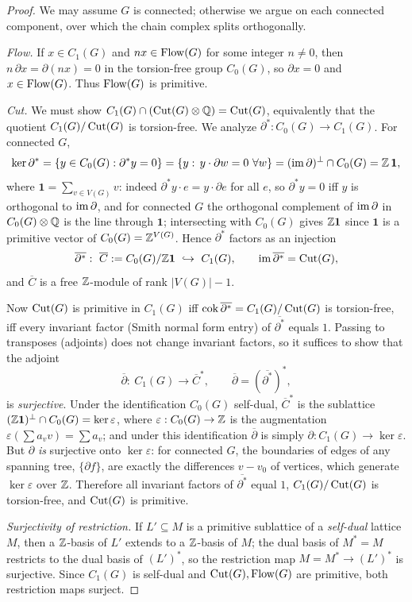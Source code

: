 \begin{proof}
We may assume $G$ is connected; otherwise we argue on each connected component, over which
the chain complex splits orthogonally.

\emph{Flow.}  If $x\in C_1(G)$ and $nx\in\operatorname{Flow}(G)$ for some integer $n\ne 0$, then
$n\,\partial x=\partial(nx)=0$ in the torsion-free group $C_0(G)$, so $\partial x=0$ and
$x\in\operatorname{Flow}(G)$.  Thus $\operatorname{Flow}(G)$ is primitive.

\emph{Cut.}  We must show $C_1(G)\cap(\operatorname{Cut}(G)\otimes\mathbb{Q})=\operatorname{Cut}(G)$, equivalently that the
quotient $C_1(G)/\operatorname{Cut}(G)$ is torsion-free.  We analyze $\partial^\ast:C_0(G)\to C_1(G)$.
For connected $G$,
\[
\ker\partial^\ast=\{y\in C_0(G):\partial^\ast y=0\}
=\{y:\,y\cdot\partial w=0\ \forall w\}=(\operatorname{im}\partial)^\perp\cap C_0(G)=\mathbb{Z}\,\mathbf 1,
\]
where $\mathbf 1=\sum_{v\in V(G)}v$: indeed $\partial^\ast y\cdot e=y\cdot\partial e$ for all
$e$, so $\partial^\ast y=0$ iff $y$ is orthogonal to $\operatorname{im}\partial$, and for connected $G$ the
orthogonal complement of $\operatorname{im}\partial$ in $C_0(G)\otimes\mathbb{Q}$ is the line through $\mathbf 1$;
intersecting with $C_0(G)$ gives $\mathbb{Z}\mathbf 1$ since $\mathbf 1$ is a primitive vector of
$C_0(G)=\mathbb{Z}^{V(G)}$.  Hence $\partial^\ast$ factors as an injection
\[
\overline{\partial^\ast}:\ \overline C:=C_0(G)/\mathbb{Z}\mathbf 1\ \hookrightarrow\ C_1(G),
\qquad \operatorname{im}\overline{\partial^\ast}=\operatorname{Cut}(G),
\]
and $\overline C$ is a free $\mathbb{Z}$-module of rank $|V(G)|-1$.

Now $\operatorname{Cut}(G)$ is primitive in $C_1(G)$ iff $\operatorname{cok}\overline{\partial^\ast}=C_1(G)/\operatorname{Cut}(G)$ is
torsion-free, iff every invariant factor (Smith normal form entry) of $\overline{\partial^\ast}$
equals $1$.  Passing to transposes (adjoints) does not change invariant factors, so it
suffices to show that the adjoint
\[
\overline\partial:\ C_1(G)\longrightarrow \overline C^\ast,
\qquad \overline\partial=(\overline{\partial^\ast})^\ast,
\]
is \emph{surjective}.  Under the identification $C_0(G)$ self-dual, $\overline C^\ast$ is the
sublattice $(\mathbb{Z}\mathbf 1)^\perp\cap C_0(G)=\ker\varepsilon$, where
$\varepsilon:C_0(G)\to\mathbb{Z}$ is the augmentation $\varepsilon(\sum a_v v)=\sum a_v$; and under
this identification $\overline\partial$ is simply $\partial:C_1(G)\to\ker\varepsilon$.  But
$\partial$ \emph{is} surjective onto $\ker\varepsilon$: for connected $G$, the boundaries of
edges of any spanning tree, $\{\partial f\}$, are exactly the differences $v-v_0$ of
vertices, which generate $\ker\varepsilon$ over $\mathbb{Z}$.  Therefore all invariant factors of
$\overline{\partial^\ast}$ equal $1$, $C_1(G)/\operatorname{Cut}(G)$ is torsion-free, and $\operatorname{Cut}(G)$ is
primitive.

\emph{Surjectivity of restriction.}  If $L'\subseteq M$ is a primitive sublattice of a
\emph{self-dual} lattice $M$, then a $\mathbb{Z}$-basis of $L'$ extends to a $\mathbb{Z}$-basis of $M$; the
dual basis of $M^\ast=M$ restricts to the dual basis of $(L')^\ast$, so the restriction map
$M=M^\ast\to(L')^\ast$ is surjective.  Since $C_1(G)$ is self-dual and $\operatorname{Cut}(G),\operatorname{Flow}(G)$ are
primitive, both restriction maps surject.
\end{proof}

